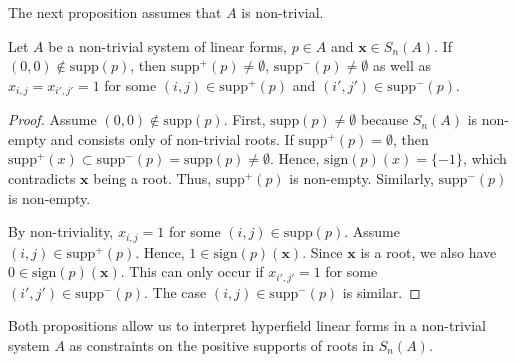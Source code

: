 The next proposition assumes that $A$ is non-trivial. 

\begin{proposition}
Let $A$ be a non-trivial system of linear forms, $p \in A$ and $\mathbf{x} \in S_{n}(A)$. 
If $(0,0) \notin \mathrm{supp}(p)$, then $\mathrm{supp}^+(p) \neq \emptyset$, $\mathrm{supp}^-(p) \neq \emptyset$ as well as $x_{i,j} = x_{i',j'} = 1$ for some $(i,j) \in \mathrm{supp}^+(p)$ and $(i',j') \in \mathrm{supp}^-(p)$.
\end{proposition}

\begin{proof}
Assume $(0,0) \notin \mathrm{supp}(p)$. First, $\mathrm{supp}(p) \neq \emptyset$ because $S_{n}(A)$ is non-empty and consists only of non-trivial roots. If $\mathrm{supp}^+(p) = \emptyset$, then $\mathrm{supp}^+(x) \subset \mathrm{supp}^-(p) = \mathrm{supp}(p) \neq \emptyset$. Hence, $\mathrm{sign}(p)(x) = \{ -1 \}$, which contradicts $\mathbf{x}$ being a root. Thus, $\mathrm{supp}^+(p)$ is non-empty. Similarly, $\mathrm{supp}^-(p)$ is non-empty.

By non-triviality, $x_{i,j} = 1$ for some $(i,j) \in \mathrm{supp}(p)$. Assume $(i,j) \in \mathrm{supp}^+(p)$. Hence, $1 \in \mathrm{sign}(p)(\mathbf{x})$.  Since $\mathbf{x}$ is a root, we also have $0 \in \mathrm{sign}(p)(\mathbf{x})$. This can only occur if $x_{i',j'} = 1$ for some $(i',j') \in \mathrm{supp}^-(p)$. The case $(i,j) \in \mathrm{supp}^-(p)$ is similar. 
\end{proof}

Both propositions allow us to interpret hyperfield linear forms in a non-trivial system $A$ as constraints on the positive supports of roots in $S_{n}(A)$.


